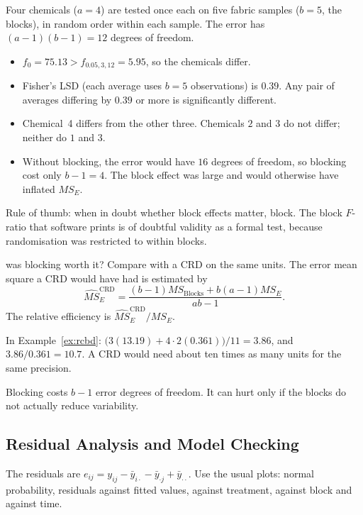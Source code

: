 \begin{example}
Four chemicals ($a=4$) are tested once each on five fabric samples ($b=5$, the blocks), in random order within each sample. The error has $(a-1)(b-1)=12$ degrees of freedom.
\begin{itemize}
  \item $f_0=75.13>f_{0.05,3,12}=5.95$, so the chemicals differ.
  \item Fisher's LSD (each average uses $b=5$ observations) is $0.39$. Any pair of averages differing by $0.39$ or more is significantly different.
  \item Chemical~4 differs from the other three. Chemicals $2$ and $3$ do not differ; neither do $1$ and $3$.
  \item Without blocking, the error would have $16$ degrees of freedom, so blocking cost only $b-1=4$. The block effect was large and would otherwise have inflated $MS_E$.
\end{itemize}
Rule of thumb: when in doubt whether block effects matter, block. The block $F$-ratio that software prints is of doubtful validity as a formal test, because randomisation was restricted to within blocks.
\end{example}

\begin{interview}{was blocking worth it?}
Compare with a CRD on the same units. The error mean square a CRD would have had is estimated by
\[ \widehat{MS}_E^{\mathrm{CRD}}=\frac{(b-1)MS_{\mathrm{Blocks}}+b(a-1)MS_E}{ab-1}. \]
The relative efficiency is $\widehat{MS}_E^{\mathrm{CRD}}/MS_E$.

In Example~\ref{ex:rcbd}: $\big(3(13.19)+4\cdot2(0.361)\big)/11=3.86$, and $3.86/0.361=10.7$. A CRD would need about ten times as many units for the same precision.

Blocking costs $b-1$ error degrees of freedom. It can hurt only if the blocks do not actually reduce variability.
\end{interview}

\subsection{Residual Analysis and Model Checking}

The residuals are $e_{ij}=y_{ij}-\bar{y}_{i\cdot}-\bar{y}_{\cdot j}+\bar{y}_{\cdot\cdot}$. Use the usual plots: normal probability, residuals against fitted values, against treatment, against block and against time.

